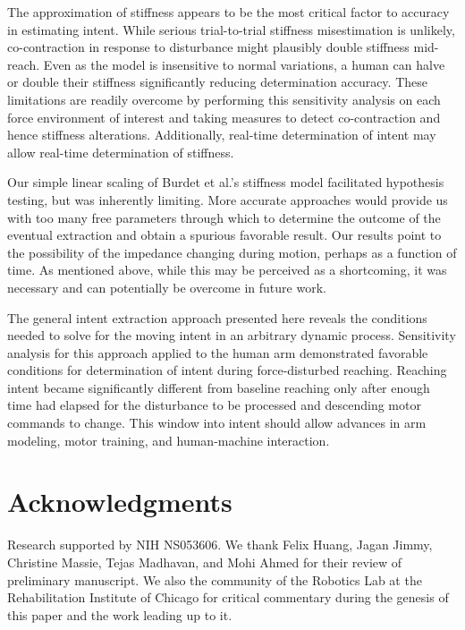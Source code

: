 \documentclass[10pt]{article}
\begin{document}
The approximation of stiffness appears to be the most critical factor to accuracy in estimating intent. While serious trial-to-trial stiffness misestimation is unlikely, co-contraction in response to disturbance might plausibly double stiffness mid-reach. Even as the model is insensitive to normal variations, a human can halve or double their stiffness \cite{franklin2007endpoint} significantly reducing determination accuracy. These limitations are readily overcome by performing this sensitivity analysis on each force environment of interest and taking measures to detect co-contraction and hence stiffness alterations. Additionally, real-time determination of intent may allow real-time determination of stiffness.

Our simple linear scaling of Burdet et al.'s stiffness model \cite{burdet2006stability} facilitated hypothesis testing, but was inherently limiting. More accurate approaches would provide us with too many free parameters through which to determine the outcome of the eventual extraction and obtain a spurious favorable result. Our results point to the possibility of the impedance changing during motion, perhaps as a function of time. As mentioned above, while this may be perceived as a shortcoming, it was necessary and can potentially be overcome in future work.

The general intent extraction approach presented here reveals the conditions needed to solve for the moving intent in an arbitrary dynamic process. Sensitivity analysis for this approach applied to the human arm demonstrated favorable conditions for determination of intent during force-disturbed reaching. Reaching intent became significantly different from baseline reaching only after enough time had elapsed for the disturbance to be processed and descending motor commands to change. This window into intent should allow advances in arm modeling, motor training, and human-machine interaction.

\section*{Acknowledgments}
Research supported by NIH NS053606.  We thank Felix Huang, Jagan Jimmy, Christine Massie, Tejas Madhavan, and Mohi Ahmed for their review of preliminary manuscript. We also the community  of the Robotics Lab at the Rehabilitation Institute of Chicago for critical commentary during the genesis of this paper and the work leading up to it.
 
\end{document}
